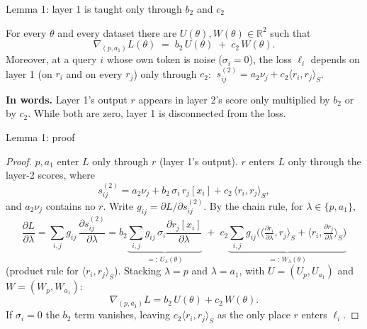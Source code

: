 \documentclass[aspectratio=169,11pt]{beamer}
\newcommand{\1}{\mathbf{1}}
\begin{document}
\begin{frame}{Lemma 1: layer 1 is taught only through $b_2$ and $c_2$}
\small
\begin{lemma}[Gating]
For every $\theta$ and every dataset there are $U(\theta),W(\theta)\in\mathbb R^2$ such that
\[
\nabla_{(p,a_1)}L(\theta)\;=\;b_2\,U(\theta)\;+\;c_2\,W(\theta).
\]
Moreover, at a query $i$ whose own token is noise ($\sigma_i=0$), the loss $\ell_i$ depends on layer 1 (on $r_i$ and on every $r_j$)
only through $c_2$: $\ s^{(2)}_{ij}=a_2\nu_j+c_2\langle r_i,r_j\rangle_S$.
\end{lemma}
\vspace{0.5em}
\textbf{In words.} Layer 1's output $r$ appears in layer 2's score only multiplied by $b_2$ or by $c_2$.
While both are zero, layer 1 is disconnected from the loss.
\end{frame}

\begin{frame}{Lemma 1: proof}
\small\setlength{\abovedisplayskip}{4pt}\setlength{\belowdisplayskip}{4pt}
\begin{proof}[Proof]
$p,a_1$ enter $L$ only through $r$ (layer 1's output). $r$ enters $L$ only through the layer-2 scores, where
\[
s^{(2)}_{ij}=a_2\nu_j+b_2\,\sigma_i\,r_j[x_i]+c_2\,\langle r_i,r_j\rangle_S ,
\]
and $a_2\nu_j$ contains no $r$. Write $g_{ij}=\partial L/\partial s^{(2)}_{ij}$. By the chain rule, for $\lambda\in\{p,a_1\}$,
\[
\frac{\partial L}{\partial\lambda}=\sum_{i,j}g_{ij}\,\frac{\partial s^{(2)}_{ij}}{\partial\lambda}
=b_2\underbrace{\sum_{i,j}g_{ij}\,\sigma_i\frac{\partial r_j[x_i]}{\partial\lambda}}_{=:\,U_\lambda(\theta)}
\;+\;c_2\underbrace{\sum_{i,j}g_{ij}\Big(\Big\langle\tfrac{\partial r_i}{\partial\lambda},r_j\Big\rangle_S+\Big\langle r_i,\tfrac{\partial r_j}{\partial\lambda}\Big\rangle_S\Big)}_{=:\,W_\lambda(\theta)}
\]
(product rule for $\langle r_i,r_j\rangle_S$). Stacking $\lambda=p$ and $\lambda=a_1$, with $U=(U_p,U_{a_1})$ and $W=(W_p,W_{a_1})$:
\[
\nabla_{(p,a_1)}L=b_2\,U(\theta)+c_2\,W(\theta).
\]
If $\sigma_i=0$ the $b_2$ term vanishes, leaving $c_2\langle r_i,r_j\rangle_S$ as the only place $r$ enters $\ell_i$.
\end{proof}
\end{frame}
\end{document}

